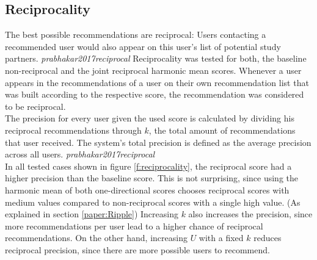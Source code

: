 \documentclass[nochapterpage,bigchapter,linedtoc,longdoc,colorback,accentcolor=tud3b,oneside]{tudreport}
\begin{document}
\subsection{Reciprocality} \label{paper:reciprocality}
The best possible recommendations are reciprocal: Users contacting a recommended user would also appear on this user's list of potential study partners. \textit{prabhakar2017reciprocal} Reciprocality was tested for both, the baseline non-reciprocal and the joint reciprocal harmonic mean scores. Whenever a user appears in the recommendations of a user on their own recommendation list that was built according to the respective score, the recommendation was considered to be reciprocal.\\
The precision for every user given the used score is calculated by dividing his reciprocal recommendations through \(k\), the total amount of recommendations that user received. The system's total precision is defined as the average precision across all users. \textit{prabhakar2017reciprocal}\\ 
In all tested cases shown in figure \ref{f:reciprocality}, the reciprocal score had a higher precision than the baseline score. This is not surprising, since using the harmonic mean of both one-directional scores chooses reciprocal scores with medium values compared to non-reciprocal scores with a single high value. (As explained in section \ref{paper:Ripple}) Increasing \(k\) also increases the precision, since more recommendations per user lead to a higher chance of reciprocal recommendations. On the other hand, increasing \(U\) with a fixed \(k\) reduces reciprocal precision, since there are more possible users to recommend.\\
\end{document}
